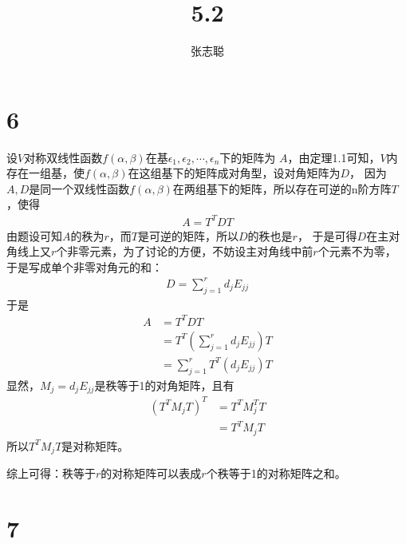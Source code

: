 \documentclass{article}
\begin{document}
\title{5.2}
\author{张志聪}
\maketitle

\section*{6}

设$V$对称双线性函数$f(\alpha, \beta)$在基$\epsilon_1, \epsilon_2, \cdots, \epsilon_n$下的矩阵为
$A$，由定理1.1可知，$V$内存在一组基，使$f(\alpha, \beta)$在这组基下的矩阵成对角型，设对角矩阵为$D$，
因为$A,D$是同一个双线性函数$f(\alpha, \beta)$在两组基下的矩阵，所以存在可逆的n阶方阵$T$，使得
\begin{align*}
  A = T^{T} D T
\end{align*}
由题设可知$A$的秩为$r$，而$T$是可逆的矩阵，所以$D$的秩也是$r$，
于是可得$D$在主对角线上又$r$个非零元素，为了讨论的方便，不妨设主对角线中前$r$个元素不为零，
于是写成单个非零对角元的和：
\begin{align*}
  D = \sum \limits_{j = 1}^r d_j E_{jj}
\end{align*}
于是
\begin{align*}
  A & = T^{T} D T                                 \\
    & = T^T (\sum \limits_{j = 1}^r d_j E_{jj}) T \\
    & = \sum \limits_{j = 1}^r T^T (d_j E_{jj}) T
\end{align*}
显然，$M_j = d_j E_{jj}$是秩等于1的对角矩阵，且有
\begin{align*}
  (T^T M_j T)^T
   & = T^T M_j^T T \\
   & = T^T M_j T
\end{align*}
所以$T^T M_j T$是对称矩阵。

综上可得：秩等于$r$的对称矩阵可以表成$r$个秩等于1的对称矩阵之和。

\section*{7}
\end{document}
